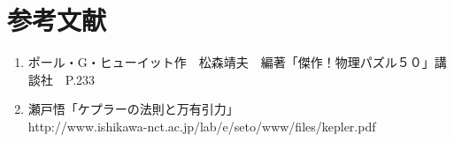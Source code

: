 \section*{参考文献}
\begin{enumerate}
  \item	ポール・G・ヒューイット作　松森靖夫　編著「傑作！物理パズル５０」講談社　P.233
  \item	瀬戸悟「ケプラーの法則と万有引力」\\
  http://www.ishikawa-nct.ac.jp/lab/e/seto/www/files/kepler.pdf
\end{enumerate}
